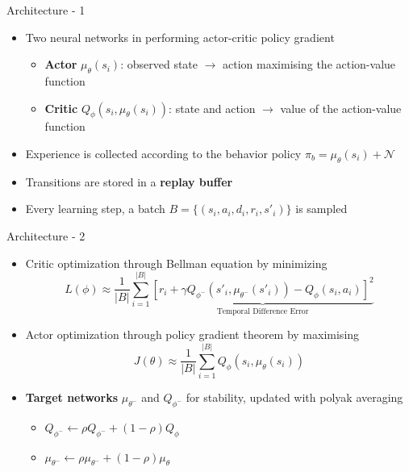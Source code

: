 \documentclass{beamer}
\begin{document}
      \begin{frame}[fragile]{Architecture - 1}
            \begin{itemize}
                  \item Two neural networks in performing actor-critic policy gradient
                        \begin{itemize}
                              \item \textbf{Actor} $\mu_{\theta}(s_i)$: observed state $\rightarrow$ action maximising the action-value function
                              \item \textbf{Critic} $Q_{\phi}(s_i,\mu_{\theta}(s_i))$: state and action $\rightarrow$ value of the action-value function
                        \end{itemize}
                  \item Experience is collected according to the behavior policy $\pi_b = \mu_{\theta}(s_i) + \mathcal{N}$
                  \item Transitions are stored in a \textbf{replay buffer}
                  \item Every learning step, a batch $B = \{(s_i,a_i,d_i,r_i,s'_i)\}$ is sampled 
            \end{itemize}
      \end{frame}

      \begin{frame}[fragile]{Architecture - 2}
            \begin{itemize}
                  \item Critic optimization through Bellman equation by minimizing
                        \begin{equation}
                              L(\phi) \approx \frac{1}{|B|} \sum_{i=1}^{|B|} \underbrace{\left[ r_i + \gamma Q_{\phi^-}(s'_i,\mu_{\theta^-}(s'_i)) - Q_{\phi}(s_i,a_i)\right]^2}_{\text{Temporal Difference Error}}
                        \end{equation}
                  \item Actor optimization through policy gradient theorem by maximising
                        \begin{equation}
                              J(\theta) \approx \frac{1}{|B|} \sum_{i=1}^{|B|} Q_{\phi}(s_i,\mu_{\theta}(s_i))
                        \end{equation}
                  \item \textbf{Target networks} $\mu_{\theta^-}$ and $Q_{\phi^-}$ for stability, updated with polyak averaging
                        \begin{itemize}
                              \item $Q_{\phi^-} \gets \rho Q_{\phi^-}+ (1-\rho)Q_{\phi}$
                              \item $\mu_{\theta^-} \gets \rho\mu_{\theta^-} + (1-\rho)\mu_{\theta}$
                        \end{itemize}
            \end{itemize}
      \end{frame}
\end{document}
